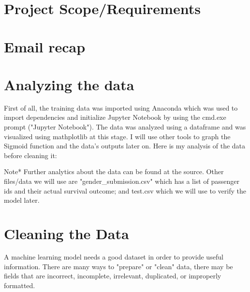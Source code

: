 \documentclass[notitlepage,a4paper,oneside,article,table]{article}
\begin{document}
\section{Project Scope/Requirements}



\section{Email recap}



\section{Analyzing the data}
First of all, the training data was imported using Anaconda which was used to import dependencies and initialize Jupyter Notebook by using the cmd.exe prompt ("Jupyter Notebook"). The data was analyzed using a dataframe and was visualized using mathplotlib at this stage. I will use other tools to graph the Sigmoid function and the data's outputs later on. Here is my analysis of the data before cleaning it:\vspace{0.5cm}

Note* Further analytics about the data can be found at the source. Other files/data we will use are "gender\_submission.csv" which has a list of passenger ids and their actual survival outcome; and test.csv which we will use to verify the model later. 








\iffalse 
Use this comment to keep track of references and work specific to this section
https://tex.stackexchange.com/questions/105589/insert-pdf-file-in-latex-document

\fi

\section{Cleaning the Data}
A machine learning model needs a good dataset in order to provide useful information. There are many ways to "prepare" or "clean" data, there may be fields that are incorrect, incomplete, irrelevant, duplicated, or improperly formatted.
\end{document}
